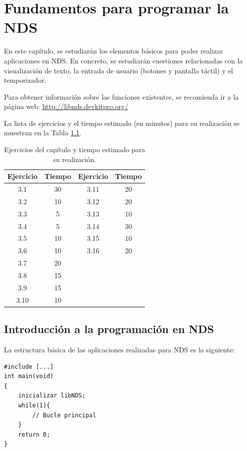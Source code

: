 \chapter{Fundamentos para programar la NDS}

En este capítulo, se estudiarán los elementos básicos para poder realizar aplicaciones en NDS. En concreto, se estudiarán cuestiones relacionadas con la visualización de texto, la entrada de usuario (botones y pantalla táctil) y el temporizador. 

Para obtener información sobre las funciones existentes, se recomienda ir a la página web: \url{http://libnds.devkitpro.org/}

La lista de ejercicios y el tiempo estimado (en minutos) para su realización se muestran en la Tabla \ref{c3_tab:ejercios}.

\begin{table}[t]
\centering
\caption{Ejercicios del capítulo y tiempo estimado para su realización.}
\begin{tabular}{|c|c|c|c|}
\hline 
Ejercicio & Tiempo & Ejercicio & Tiempo  \\ 
\hline 
 3.1 & 30  & 3.11 & 20 \\ 
 3.2 & 10  & 3.12 & 20 \\ 
 3.3 & 5   & 3.13 & 10 \\ 
 3.4 & 5   & 3.14 & 30 \\ 
 3.5 & 10  & 3.15 & 10 \\ 
 3.6 & 10  & 3.16 & 20 \\ 
 3.7 & 20  & & \\ 
 3.8 & 15  & & \\ 
 3.9 & 15  & & \\ 
 3.10 & 10 & & \\
\hline 
\end{tabular} 
\label{c3_tab:ejercios}
\end{table}
\section{Introducción a la programación en NDS}
La estructura básica de las aplicaciones realizadas para NDS es la siguiente:

\begin{lstlisting}
#include [...] 
int main(void)
{
	inicializar libNDS; 
	while(1){
		// Bucle principal 
	}
	return 0;
}
\end{lstlisting}

